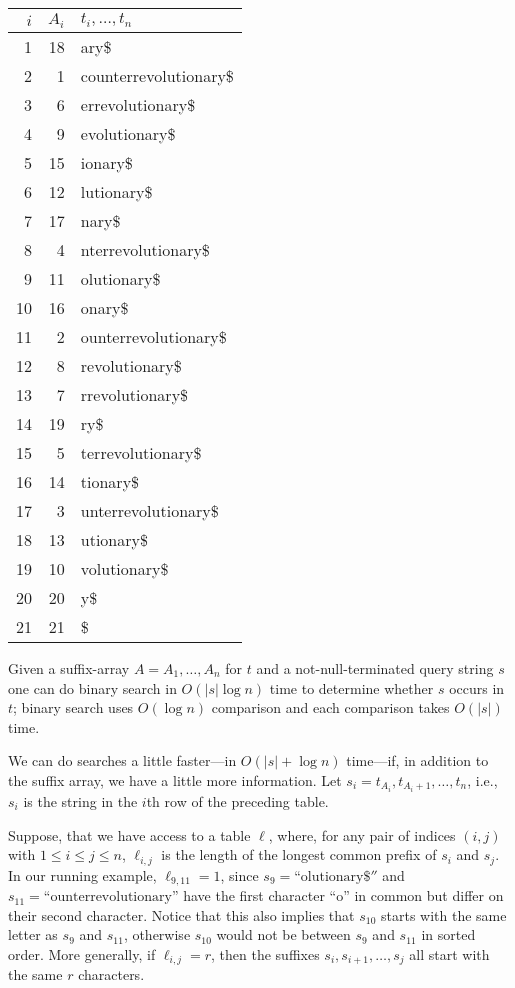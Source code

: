 \begin{center}
  \begin{tabular}{|r|r|l|}\hline
    $i$ & $A_i$ & $t_i,\ldots,t_n$ \\\hline
1&18&ary\$\\
2&1&counterrevolutionary\$\\
3&6&errevolutionary\$\\
4&9&evolutionary\$\\
5&15&ionary\$\\
6&12&lutionary\$\\
7&17&nary\$\\
8&4&nterrevolutionary\$\\
9&11&olutionary\$\\
10&16&onary\$\\
11&2&ounterrevolutionary\$\\
12&8&revolutionary\$\\
13&7&rrevolutionary\$\\
14&19&ry\$\\
15&5&terrevolutionary\$\\
16&14&tionary\$\\
17&3&unterrevolutionary\$\\
18&13&utionary\$\\
19&10&volutionary\$\\
20&20&y\$\\
21&21&\$\\\hline
\end{tabular}
\end{center}

Given a suffix-array $A=A_1,\ldots,A_n$ for $t$ and a not-null-terminated
query string $s$ one can do binary search in $O(|s|\log n)$ time to
determine whether $s$ occurs in $t$;  binary search uses $O(\log n)$
comparison and each comparison takes $O(|s|)$ time.

We can do searches a little faster---in $O(|s|+\log n)$ time---if,
in addition to the suffix array, we have a little more information.
Let $s_i=t_{A_i}, t_{A_i+1},\ldots,t_{n}$, i.e., $s_i$ is the string in
the $i$th row of the preceding table.

Suppose, that we have access to a table $\ell$, where, for any
pair of indices $(i,j)$ with $1\le i\le j\le n$, $\ell_{i,j}$ is
the length of the longest common prefix of $s_i$ and $s_j$. In our
running example, $\ell_{9,11}=1$, since $s_9=\text{``olutionary\$}''$
and $s_{11}=\text{``ounterrevolutionary''}$ have the first character
``o'' in common but differ on their second character.  Notice that
this also implies that $s_{10}$ starts with the same letter as $s_9$
and $s_{11}$, otherwise $s_{10}$ would not be between $s_9$ and $s_{11}$
in sorted order.  More generally, if $\ell_{i,j}=r$, then the suffixes
$s_i,s_{i+1},\ldots,s_{j}$ all start with the same $r$ characters.


